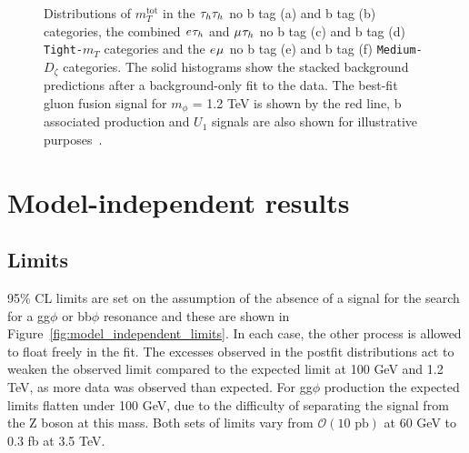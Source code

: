 \begin{figure}[!hbtp]
\caption{Distributions of $m_{T}^\text{tot}$ in the $\tau_{h}\tau_{h}$ no b tag (a) and b tag (b) categories, the combined $e_{}\tau_{h}$ and $\mu_{}\tau_{h}$ no b tag (c) and b tag (d) \texttt{Tight-$m_{T}$} categories and the $e_{}\mu_{}$ no b tag (e) and b tag (f) \texttt{Medium-$D_{\zeta}$} categories. The solid histograms show the stacked background predictions after a background-only fit to the data. The best-fit gluon fusion signal for $m_{\phi}$ = 1.2 TeV is shown by the red line, b associated production and $U_{1}$ signals are also shown for illustrative purposes~\cite{CMS:2022rbd}.}
\label{fig:high_mass_postfit}
\end{figure}

\section{Model-independent results}

\subsection{Limits}

95\% \ac{CL} limits are set on the assumption of the absence of a signal for the search for a gg$\phi$ or bb$\phi$ resonance and these are shown in Figure~\ref{fig:model_independent_limits}.
In each case, the other process is allowed to float freely in the fit.
The excesses observed in the postfit distributions act to weaken the observed limit compared to the expected limit at 100 GeV and 1.2 TeV, as more data was observed than expected.
For gg$\phi$ production the expected limits flatten under 100 GeV, due to the difficulty of separating the signal from the Z boson at this mass.
Both sets of limits vary from $\mathcal{O}(10\text{ pb})$ at 60 GeV to $0.3$ fb at 3.5 TeV. \\

